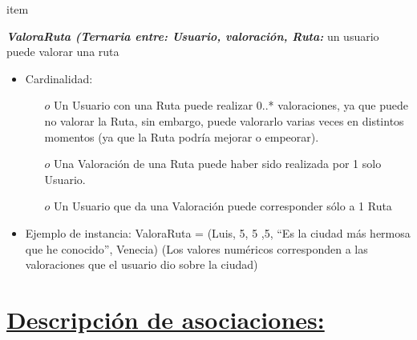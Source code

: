 \documentclass[a4paper]{article}
\begin{document}
\begin{itemize}
{\begin{itemize}
 \end{itemize}



}



item{

  
	\textbf{\textit{ValoraRuta (Ternaria entre: Usuario, valoración, Ruta:}}
     un usuario puede valorar una ruta
        
        
 \begin{itemize}
        
  \item Cardinalidad:
  
  
  \begin{itemize}
\item[$o$]Un Usuario con una Ruta puede realizar 0..* valoraciones, ya que puede no valorar la Ruta, sin embargo, puede valorarlo varias veces en distintos momentos (ya que la Ruta podría mejorar o empeorar).
\item[$o$] Una Valoración de una Ruta puede haber sido realizada por 1 solo Usuario.
\item[$o$] Un Usuario que da una Valoración puede corresponder sólo a 1 Ruta

\end{itemize}




\item Ejemplo de instancia: ValoraRuta = {(Luis, 5, 5 ,5, “Es la ciudad más hermosa que he conocido”, Venecia)} (Los valores numéricos corresponden a las valoraciones que el usuario dio sobre la ciudad)

 \end{itemize}



}

\end{itemize}


\section{\underline{Descripción de asociaciones:} }
\end{document}
